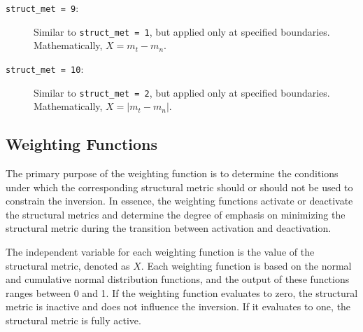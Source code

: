 \documentclass[a4paper,12pt]{article}
\begin{document}
\begin{description}
    \item[\texttt{struct\_met = 9}:] Similar to \texttt{struct\_met = 1}, but applied only at specified boundaries. Mathematically, \( X = m_t - m_n \).
    
    \item[\texttt{struct\_met = 10}:] Similar to \texttt{struct\_met = 2}, but applied only at specified boundaries. Mathematically, \( X = |m_t - m_n| \).
\end{description}

\subsection{Weighting Functions} \label{weighting_functions}

The primary purpose of the weighting function is to determine the conditions under which the corresponding structural metric should or should not be used to constrain the inversion. In essence, the weighting functions activate or deactivate the structural metrics and determine the degree of emphasis on minimizing the structural metric during the transition between activation and deactivation.

The independent variable for each weighting function is the value of the structural metric, denoted as \(X\). Each weighting function is based on the normal and cumulative normal distribution functions, and the output of these functions ranges between 0 and 1. If the weighting function evaluates to zero, the structural metric is inactive and does not influence the inversion. If it evaluates to one, the structural metric is fully active.
\end{document}
